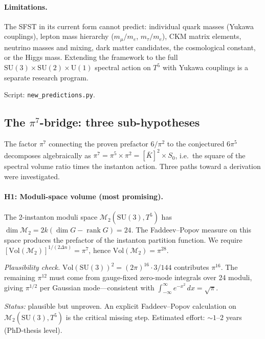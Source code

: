\paragraph{Limitations.}
The SFST in its current form cannot predict: individual quark masses
(Yukawa couplings), lepton mass hierarchy ($m_\mu/m_e$, $m_\tau/m_e$),
CKM matrix elements, neutrino masses and mixing, dark matter
candidates, the cosmological constant, or the Higgs mass.  Extending
the framework to the full
$\mathrm{SU}(3)\times\mathrm{SU}(2)\times\mathrm{U}(1)$ spectral
action on $T^5$ with Yukawa couplings is a separate research program.

Script: \texttt{new\_predictions.py}.


\subsection{The $\pi^7$-bridge: three sub-hypotheses}
\label{sec:pi7_hypotheses}

The factor $\pi^7$ connecting the proven prefactor $6/\pi^2$ to the
conjectured $6\pi^5$ decomposes algebraically as
$\pi^7=\pi^5\times\pi^2=[\bar K]^2\times S_0$, i.e.\ the square of
the spectral volume ratio times the instanton action. Three paths
toward a derivation were investigated.

\paragraph{H1: Moduli-space volume (most promising).}
The 2-instanton moduli space
$\mathcal{M}_2(\mathrm{SU}(3),T^5)$ has
$\dim\mathcal{M}_2=2k(\dim G-\operatorname{rank}G)=24$.
The Faddeev--Popov measure on this space produces the prefactor of
the instanton partition function.  We require
$[\mathrm{Vol}(\mathcal{M}_2)]^{1/(2\Delta n)}=\pi^7$, hence
$\mathrm{Vol}(\mathcal{M}_2)=\pi^{28}$.

\emph{Plausibility check.}
$\mathrm{Vol}(\mathrm{SU}(3))^2=(2\pi)^{16}\cdot 3/144$
contributes $\pi^{16}$.  The remaining $\pi^{12}$ must come from
gauge-fixed zero-mode integrals over 24 moduli, giving $\pi^{1/2}$
per Gaussian mode---consistent with $\int_{-\infty}^\infty
e^{-x^2}\,dx=\sqrt\pi$.

\emph{Status:} plausible but unproven.  An explicit Faddeev--Popov
calculation on $\mathcal{M}_2(\mathrm{SU}(3),T^5)$ is the critical
missing step.  Estimated effort: $\sim\!1$--$2$ years (PhD-thesis level).


